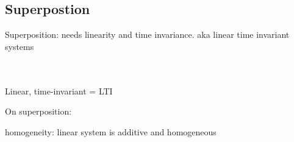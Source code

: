 \subsection*{Superpostion}

Superposition: needs linearity and time invariance. aka linear time invariant
systems

\\\\
Linear, time-invariant = LTI

On superposition:\\

homogeneity: linear system is additive and homogeneous
